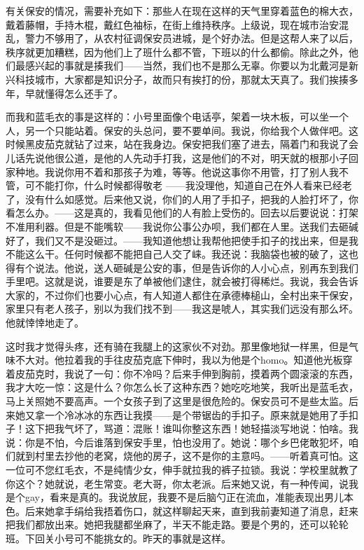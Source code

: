 有关保安的情况，需要补充如下：那些人在现在这样的天气里穿着蓝色的棉大衣，戴着藤帽，手持木棍，戴红色袖标，在街上维持秩序。上级说，现在城市治安混乱，警力不够用了，从农村征调保安员进城，是个好办法。但是这帮人来了以后，秩序就更加糟糕，因为他们上了班什么都不管，下班以的什么都偷。除此之外，他们最感兴起的事就是揍我们——当然，我们也不是那么无辜。你要以为北戴河是新兴科技城市，大家都是知识分子，故而只有挨打的份，那就太天真了。我们挨揍多年，早就懂得怎么还手了。 

而我和蓝毛衣的事是这样的：小号里面像个电话亭，架着一块木板，可以坐一个人，另一个只能站着。保安的头总问，要不要单间。我说，你给我个人做伴吧。这时候黑皮茄克就钻了过来，站在我身边。保安把我们塞了进去，隔着门和我说了会儿话先说他很公道，是他的人先动手打我，这是他们的不对，明天就的根那小子回家种地。我说你用不着和那孩子为难，等等。他说这事你不用管，打了别人我不管，可不能打你，什么时候都得敬老 ——我没理他，知道自己在外人看来已经老了，没有什么如感觉。后来他又说，你们的人用了手扣子，把我的人脸打坏了，你看怎么办。——这是真的，我看见他们的人有脸上受伤的。回去以后要说说：打架不准用利器。但是不能嘴软——我说你公事公办呗，我们都在人里。送我们去砸碱好了，我们又不是没砸过。——我知道他想让我帮他把使手扣子的找出来，但是我不能这么干。任何时候都不能把自己人交了崃。我还说：我脑袋也被的破了，这也得有个说法。他说，送人砸碱是公安的事，但是告诉你的人小心点，别再东到我们手里吧。这就是说，谁要是东了单被他们逮住，就会被打得稀烂。我说，我会告诉大家的，不过你们也要小心点，有人知道人都住在承德棒槌山，全村出来干保安，家里只有老人孩子，别以为我们找不到——我这是唬人，其实我们远没有那么坏。他就悻悻地走了。 

这时我才觉得头疼，还有骑在我腿上的这家伙不对劲。那里像地狱一样黑，但是气味不大对。他拉着我的手往皮茄克底下伸时，我以为他是个homo。知道他光板穿着皮茄克时，我说了一句：你不冷吗？后来手伸到胸前，摸着两个圆滚滚的东西，我才大吃一惊：这是什么？你怎么长了这种东西？她吃吃地笑，我听出是蓝毛衣，马上关照她不要高声。一个女孩子到了这里是很危险的。保安员可不是些太监。后来她又拿一个冷冰冰的东西让我摸——是个带锯齿的手扣子。原来就是她用了手扣子！这下把我气坏了，骂道：混账！谁叫你整这东西！她轻描淡写地说：怕啥。我说：你是不怕，今后谁落到保安手里，怕也没用了。她说：哪个乡巴佬敢犯坏，咱们就到村里去抄他的老窝，烧他的房子，这不是你的主意吗。——听着真可怕。这一位可不您红毛衣，不是纯情少女，伸手就拉我的裤子拉锁。我说：学校里就教了你这个？她就说，老生常变。老大哥，你太老派。后来她又说，有一种传闻，说我是个gay，看来是真的。我说放屁，我要不是后脑勺正在流血，准能表现出男儿本色。后来她拿手绢给我捂着伤口，就这样聊起天来，直到我前妻知道了消息，赶来把我们都放出来。她把我腿都坐麻了，半天不能走路。要是个男的，还可以轮轮班。下回关小号可不能挑女的。昨天的事就是这样。 



